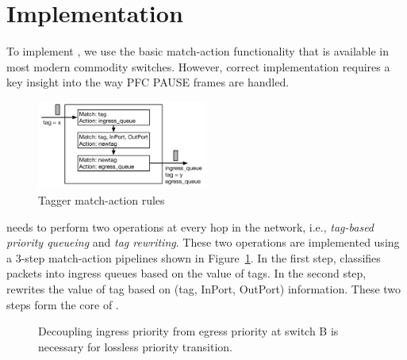 \section{Implementation}\label{sec:implementation}

To implement \sysname{}, we use the basic match-action functionality that is
available in most modern commodity switches. However, correct implementation
requires a key insight into the way PFC PAUSE frames are handled.

\begin{figure}
	\hspace{-0.2in}
	\centering
	\includegraphics[width=0.5\textwidth] {figs/Tagger}
	\vspace{-1em}
	\caption{Tagger match-action rules}\label{fig:tagger}
	\vspace{-1em}
\end{figure}

 \sysname{} needs to perform two operations at every
hop in the network, i.e., {\em tag-based priority queueing} and {\em tag
rewriting}.  These two operations are implemented using a 3-step match-action
pipelines shown in Figure~\ref{fig:tagger}.  In the first step, \sysname{}
classifies packets into ingress queues based on the value of tags. In the second
step, \sysname{} rewrites the value of tag based on (tag, InPort, OutPort)
information. These two steps form the core of \sysname{}.

\begin{figure}[t]
 	\centering

	 \vspace{-1em}
 	\caption{Decoupling ingress priority from egress priority at switch B is necessary for lossless priority transition.}\label{fig:prioritydecoupling}
	\vspace{-1em}
\end{figure}

